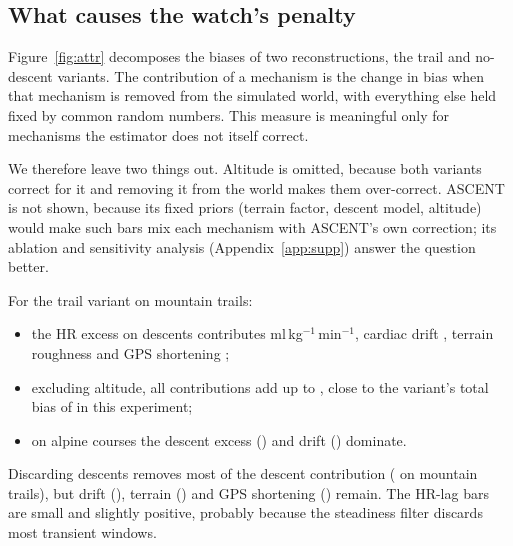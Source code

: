 \documentclass[11pt,a4paper]{article}
\newcommand{\unit}{ml\,kg$^{-1}$\,min$^{-1}$}
\newcommand{\ascent}{ASCENT}
\begin{document}
\begin{table}[!htbp]\centering\scriptsize
\caption{Main comparison: mean error (SD) [RMSE] in \unit, \nnRunnersMain{} runners per cell. Each method is scored on the sessions where it produced an estimate; n/a: fewer than 10 estimates.}\label{tab:main}

\end{table}

\subsection{What causes the watch's penalty}\label{sec:attr}
Figure~\ref{fig:attr} decomposes the biases of two reconstructions, the trail and no-descent variants. The contribution of a mechanism is the change in bias when that mechanism is removed from the simulated world, with everything else held fixed by common random numbers. This measure is meaningful only for mechanisms the estimator does not itself correct.

We therefore leave two things out. Altitude is omitted, because both variants correct for it and removing it from the world makes them over-correct. \ascent{} is not shown, because its fixed priors (terrain factor, descent model, altitude) would make such bars mix each mechanism with \ascent's own correction; its ablation and sensitivity analysis (Appendix~\ref{app:supp}) answer the question better.

For the trail variant on mountain trails:
\begin{itemize}[leftmargin=*]
\item the HR excess on descents contributes \nattrGtrailmountainecc{} \unit, cardiac drift \nattrGtrailmountaindrift, terrain roughness \nattrGtrailmountainterrain{} and GPS shortening \nattrGtrailmountaingpsbias;
\item excluding altitude, all contributions add up to \nattrSumGtrailmountain{}, close to the variant's total bias of \nattrAllGtrailmountain{} in this experiment;
\item on alpine courses the descent excess (\nattrGtrailskyrunecc) and drift (\nattrGtrailskyrundrift) dominate.
\end{itemize}
Discarding descents removes most of the descent contribution (\nattrGtrailnodescmountainecc{} on mountain trails), but drift (\nattrGtrailnodescmountaindrift), terrain (\nattrGtrailnodescmountainterrain) and GPS shortening (\nattrGtrailnodescmountaingpsbias) remain. The HR-lag bars are small and slightly positive, probably because the steadiness filter discards most transient windows.
\end{document}
